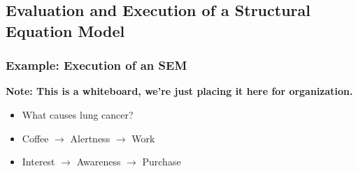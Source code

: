 \documentclass[12pt, block=fill]{beamer}
\begin{document}
\subsection{Evaluation and Execution of a Structural Equation Model} 

\begin{frame}
  \frametitle{Example: Execution of an SEM}
  \textbf{Note: This is a whiteboard, we're just placing it here for
    organization.}
  \begin{itemize}
  \item What causes lung cancer? 
  \item Coffee $\rightarrow$ Alertness $\rightarrow$ Work 
  \item Interest $\rightarrow$ Awareness $\rightarrow$ Purchase
  \end{itemize} 
\end{frame}

\begin{frame}
  \frametitle{}
\end{frame} 
\end{document}
